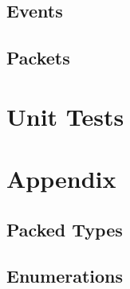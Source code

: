 \subsection{Events}



\subsection{Packets}



\section{Unit Tests}



\section{Appendix}
\subsection{Packed Types}



\subsection{Enumerations}




